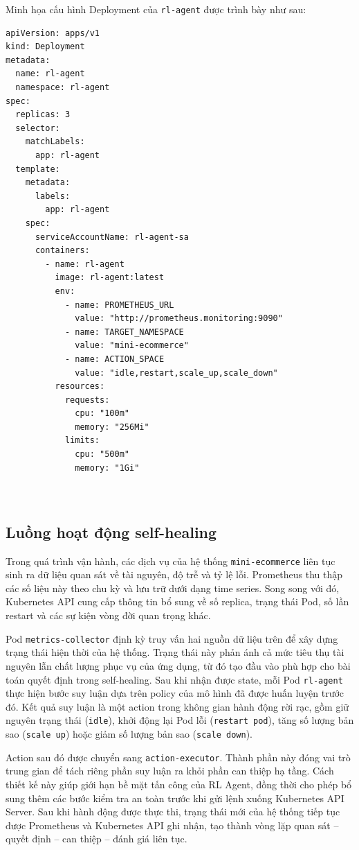 \noindent Minh họa cấu hình Deployment của \texttt{rl-agent} được trình bày như sau:
\begin{lstlisting}
apiVersion: apps/v1
kind: Deployment
metadata:
  name: rl-agent
  namespace: rl-agent
spec:
  replicas: 3
  selector:
    matchLabels:
      app: rl-agent
  template:
    metadata:
      labels:
        app: rl-agent
    spec:
      serviceAccountName: rl-agent-sa
      containers:
        - name: rl-agent
          image: rl-agent:latest
          env:
            - name: PROMETHEUS_URL
              value: "http://prometheus.monitoring:9090"
            - name: TARGET_NAMESPACE
              value: "mini-ecommerce"
            - name: ACTION_SPACE
              value: "idle,restart,scale_up,scale_down"
          resources:
            requests:
              cpu: "100m"
              memory: "256Mi"
            limits:
              cpu: "500m"
              memory: "1Gi"



\end{lstlisting}

\subsection{Luồng hoạt động self-healing}

Trong quá trình vận hành, các dịch vụ của hệ thống \texttt{mini-ecommerce} liên tục sinh ra dữ liệu quan sát về tài nguyên, độ trễ và tỷ lệ lỗi. Prometheus thu thập các số liệu này theo chu kỳ và lưu trữ dưới dạng time series. Song song với đó, Kubernetes API cung cấp thông tin bổ sung về số replica, trạng thái Pod, số lần restart và các sự kiện vòng đời quan trọng khác.

\noindent Pod \texttt{metrics-collector} định kỳ truy vấn hai nguồn dữ liệu trên để xây dựng trạng thái hiện thời của hệ thống. Trạng thái này phản ánh cả mức tiêu thụ tài nguyên lẫn chất lượng phục vụ của ứng dụng, từ đó tạo đầu vào phù hợp cho bài toán quyết định trong self-healing. Sau khi nhận được state, mỗi Pod \texttt{rl-agent} thực hiện bước suy luận dựa trên policy của mô hình đã được huấn luyện trước đó. Kết quả suy luận là một action trong không gian hành động rời rạc, gồm giữ nguyên trạng thái (\texttt{idle}), khởi động lại Pod lỗi (\texttt{restart pod}), tăng số lượng bản sao (\texttt{scale up}) hoặc giảm số lượng bản sao (\texttt{scale down}).

\noindent Action sau đó được chuyển sang \texttt{action-executor}. Thành phần này đóng vai trò trung gian để tách riêng phần suy luận ra khỏi phần can thiệp hạ tầng. Cách thiết kế này giúp giới hạn bề mặt tấn công của RL Agent, đồng thời cho phép bổ sung thêm các bước kiểm tra an toàn trước khi gửi lệnh xuống Kubernetes API Server. Sau khi hành động được thực thi, trạng thái mới của hệ thống tiếp tục được Prometheus và Kubernetes API ghi nhận, tạo thành vòng lặp quan sát -- quyết định -- can thiệp -- đánh giá liên tục.

